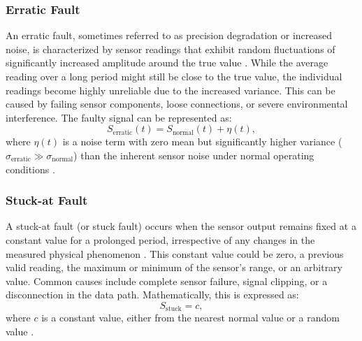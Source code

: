 \subsubsection{Erratic Fault}
An erratic fault, sometimes referred to as precision degradation or increased noise, is characterized by sensor readings that exhibit random fluctuations of significantly increased amplitude around the true value \cite{Saeed2021}. While the average reading over a long period might still be close to the true value, the individual readings become highly unreliable due to the increased variance. This can be caused by failing sensor components, loose connections, or severe environmental interference. The faulty signal can be represented as:
\begin{equation}
S_\text{erratic}(t) = S_\text{normal}(t) + \eta(t),
\label{eq:erratic}
\end{equation}
where \(\eta(t)\) is a noise term with zero mean but significantly higher variance (\(\sigma_\text{erratic} \gg \sigma_\text{normal}\)) than the inherent sensor noise under normal operating conditions \cite{Saeed2021}.

\subsubsection{Stuck-at Fault}
A stuck-at fault (or stuck fault) occurs when the sensor output remains fixed at a constant value for a prolonged period, irrespective of any changes in the measured physical phenomenon \cite{Saeed2021, Hasan2024, Shi2024}. This constant value could be zero, a previous valid reading, the maximum or minimum of the sensor's range, or an arbitrary value. Common causes include complete sensor failure, signal clipping, or a disconnection in the data path. Mathematically, this is expressed as:
\begin{equation}
S_\text{stuck} = c,
\label{eq:stuck}
\end{equation}
where \(c\) is a constant value, either from the nearest normal value or a random value \cite{Saeed2021, Hasan2024, Shi2024}.
